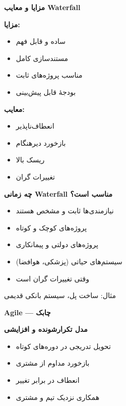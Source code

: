 \documentclass[14pt, a4paper, landscape]{extarticle}
\newcommand{\slide}[1]{%
    \newpage
    \begin{center}
    \begin{minipage}[t]{0.95\textwidth}
    \vspace{0.5cm}
    #1
    \vspace{0.5cm}
    \end{minipage}
    \end{center}
}
\newcommand{\slidetitle}[1]{%
    \begin{center}
        {\LARGE\bfseries\textcolor{primary}{#1}}
    \end{center}
    \vspace{0.5cm}
}
\newcommand{\myaccent}[1]{\textcolor{accent}{#1}}
\begin{document}
\slide{
    \slidetitle{مزایا و معایب Waterfall}
    \vspace{0.5cm}
    \begin{minipage}[t]{0.48\textwidth}
        {\large\bfseries\textcolor{primary}{مزایا:}}
        \vspace{0.3cm}
        \begin{itemize}[itemsep=0.3em]
            \item ساده و قابل فهم
            \item مستندسازی کامل
            \item مناسب پروژه‌های ثابت
            \item بودجهٔ قابل پیش‌بینی
        \end{itemize}
    \end{minipage}
    \hfill
    \begin{minipage}[t]{0.48\textwidth}
        {\large\bfseries\myaccent{معایب:}}
        \vspace{0.3cm}
        \begin{itemize}[itemsep=0.3em]
            \item انعطاف‌ناپذیر
            \item بازخورد دیرهنگام
            \item ریسک بالا
            \item تغییرات گران
        \end{itemize}
    \end{minipage}
}

\slide{
    \slidetitle{چه زمانی Waterfall مناسب است؟}
    \vspace{1cm}
    \begin{itemize}[itemsep=0.7em]
        \item {\large نیازمندی‌ها ثابت و مشخص هستند}
        \item {\large پروژه‌های کوچک و کوتاه}
        \item {\large پروژه‌های دولتی و پیمانکاری}
        \item {\large سیستم‌های حیاتی (پزشکی، هوافضا)}
        \item {\large وقتی تغییرات گران است}
    \end{itemize}
    \vspace{1cm}
    \begin{center}
        {\large\myaccent{مثال: ساخت پل، سیستم بانکی قدیمی}}
    \end{center}
}

\slide{
    \slidetitle{Agile — چابک}
    \vspace{0.5cm}
    \begin{center}
        {\large\bfseries مدل تکرارشونده و افزایشی}
    \end{center}
    \vspace{1cm}
    \begin{itemize}[itemsep=0.6em]
        \item {\large تحویل تدریجی در دوره‌های کوتاه}
        \item {\large بازخورد مداوم از مشتری}
        \item {\large انعطاف در برابر تغییر}
        \item {\large همکاری نزدیک تیم و مشتری}
    \end{itemize}
}
\end{document}
